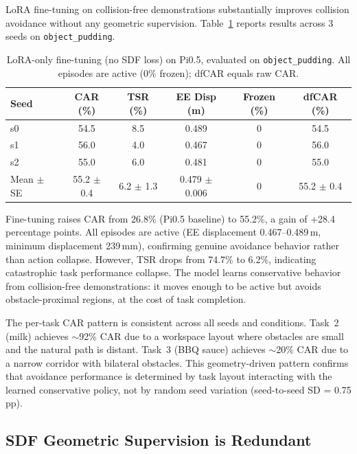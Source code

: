 \documentclass[10pt,letterpaper]{article}
\begin{document}
LoRA fine-tuning on collision-free demonstrations substantially improves collision avoidance without any geometric supervision. Table~\ref{tab:lora_3seed} reports results across 3 seeds on \texttt{object\_pudding}.

\begin{table}[t]
\centering
\caption{LoRA-only fine-tuning (no SDF loss) on Pi0.5, evaluated on \texttt{object\_pudding}. All episodes are active (0\% frozen); dfCAR equals raw CAR.}
\label{tab:lora_3seed}
\begin{tabular}{lccccc}
\toprule
Seed & CAR (\%) & TSR (\%) & EE Disp (m) & Frozen (\%) & dfCAR (\%) \\
\midrule
s0   & 54.5 & 8.5 & 0.489 & 0 & 54.5 \\
s1   & 56.0 & 4.0 & 0.467 & 0 & 56.0 \\
s2   & 55.0 & 6.0 & 0.481 & 0 & 55.0 \\
\midrule
Mean $\pm$ SE & 55.2 $\pm$ 0.4 & 6.2 $\pm$ 1.3 & 0.479 $\pm$ 0.006 & 0 & 55.2 $\pm$ 0.4 \\
\bottomrule
\end{tabular}
\end{table}

Fine-tuning raises CAR from 26.8\% (Pi0.5 baseline) to 55.2\%, a gain of +28.4 percentage points. All episodes are active (EE displacement 0.467--0.489\,m, minimum displacement 239\,mm), confirming genuine avoidance behavior rather than action collapse. However, TSR drops from 74.7\% to 6.2\%, indicating catastrophic task performance collapse. The model learns conservative behavior from collision-free demonstrations: it moves enough to be active but avoids obstacle-proximal regions, at the cost of task completion.

The per-task CAR pattern is consistent across all seeds and conditions. Task~2 (milk) achieves $\sim$92\% CAR due to a workspace layout where obstacles are small and the natural path is distant. Task~3 (BBQ sauce) achieves $\sim$20\% CAR due to a narrow corridor with bilateral obstacles. This geometry-driven pattern confirms that avoidance performance is determined by task layout interacting with the learned conservative policy, not by random seed variation (seed-to-seed SD = 0.75 pp).

\subsection{SDF Geometric Supervision is Redundant}
\label{sec:sdf_redundant}
\end{document}
